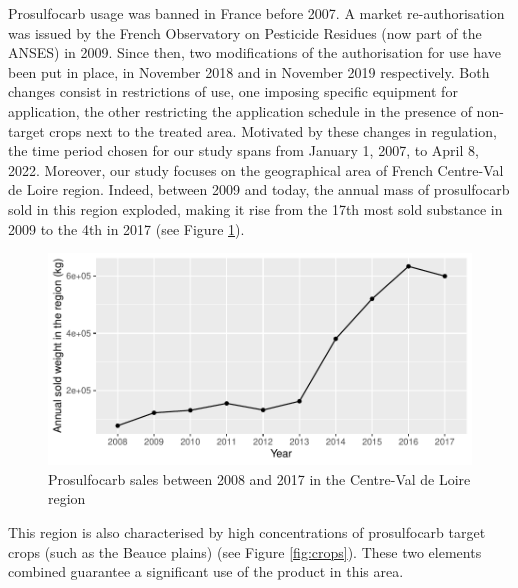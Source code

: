 Prosulfocarb usage was banned in France before 2007. A market re-authorisation was issued by the French Observatory on Pesticide Residues (now part of the ANSES) in 2009.
Since then, two modifications of the authorisation for use have been put in place, in November 2018 and in November 2019 respectively. Both changes consist in restrictions of use, one imposing specific equipment for application, the other restricting the application schedule in the presence of non-target crops next to the treated area. Motivated by these changes in regulation, the time period chosen for our study spans from January 1, 2007, to April 8, 2022.
Moreover, our study focuses on the geographical area of French Centre-Val de Loire region. Indeed, between 2009 and today, the annual mass of prosulfocarb sold in this region  exploded, making it rise from the 17th most sold substance in 2009 to the 4th in 2017 (see Figure \ref{fig:sale}). 

\begin{figure}[htbp]
  \centering
  \includegraphics[]{figs/App/Sales_pro.pdf}
  \caption{Prosulfocarb sales between 2008 and 2017 in the Centre-Val de Loire region}
  \label{fig:sale}
\end{figure}


This region is also characterised by high concentrations of prosulfocarb target crops (such as the Beauce plains) (see Figure \ref{fig:crops}). These two elements combined guarantee a significant use of the product in this area.  


